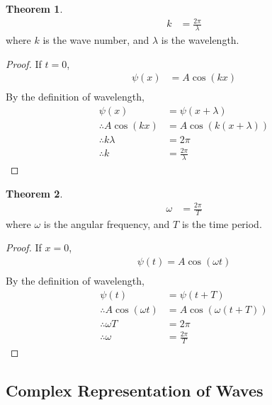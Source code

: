 \documentclass[titlepage, fleqn, a4paper, 12pt, twoside]{article}
\theoremstyle{definition}
\theoremstyle{theorem}
\newtheorem{theorem}{Theorem}
\begin{document}
\begin{theorem}
	\begin{align*}
		k & = \frac{2 \pi}{\lambda}
	\end{align*}
	where $k$ is the wave number, and $\lambda$ is the wavelength.
\end{theorem}

\begin{proof}
	If $t = 0$,
	\begin{align*}
		\psi(x) & = A \cos(k x) \\
	\end{align*}
	By the definition of wavelength,
	\begin{align*}
		\psi(x)                & = \psi(x + \lambda)                    \\
		\therefore A \cos(k x) & = A \cos\left( k (x + \lambda) \right) \\
		\therefore k \lambda   & = 2 \pi                                \\
		\therefore k           & = \frac{2 \pi}{\lambda}
	\end{align*}
\end{proof}

\begin{theorem}
	\begin{align*}
		\omega & = \frac{2 \pi}{T}
	\end{align*}
	where $\omega$ is the angular frequency, and $T$ is the time period.
\end{theorem}

\begin{proof}
	If $x = 0$,
	\begin{align*}
		\psi(t) = A \cos(\omega t) \\
	\end{align*}
	By the definition of wavelength,
	\begin{align*}
		\psi(t)                     & = \psi(t + T)                         \\
		\therefore A \cos(\omega t) & = A \cos\left( \omega (t + T) \right) \\
		\therefore \omega T         & = 2 \pi                               \\
		\therefore \omega           & = \frac{2 \pi}{T}
	\end{align*}
\end{proof}

\subsection{Complex Representation of Waves}
\end{document}
